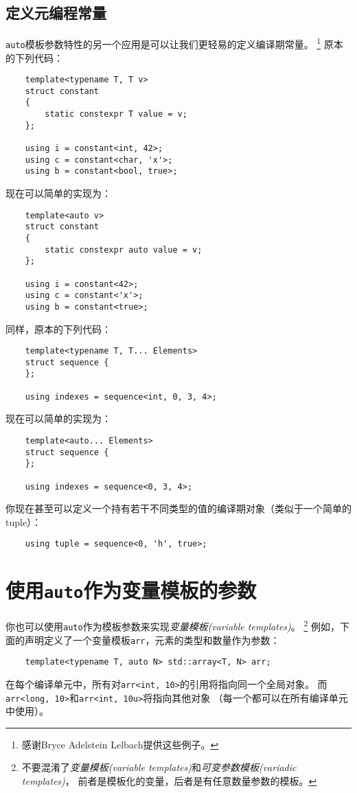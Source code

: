 \subsection{定义元编程常量}
\texttt{auto}模板参数特性的另一个应用是可以让我们更轻易的定义编译期常量。
\footnote{感谢Bryce Adelstein Lelbach提供这些例子。}
原本的下列代码：
\begin{lstlisting}
    template<typename T, T v>
    struct constant
    {
        static constexpr T value = v;
    };

    using i = constant<int, 42>;
    using c = constant<char, 'x'>;
    using b = constant<bool, true>;
\end{lstlisting}
现在可以简单的实现为：
\begin{lstlisting}
    template<auto v>
    struct constant
    {
        static constexpr auto value = v;
    };

    using i = constant<42>;
    using c = constant<'x'>;
    using b = constant<true>;
\end{lstlisting}
同样，原本的下列代码：
\begin{lstlisting}
    template<typename T, T... Elements>
    struct sequence {
    };

    using indexes = sequence<int, 0, 3, 4>;
\end{lstlisting}
现在可以简单的实现为：
\begin{lstlisting}
    template<auto... Elements>
    struct sequence {
    };

    using indexes = sequence<0, 3, 4>;
\end{lstlisting}
你现在甚至可以定义一个持有若干不同类型的值的编译期对象（类似于一个简单的tuple）：
\begin{lstlisting}
    using tuple = sequence<0, 'h', true>;
\end{lstlisting}

\section{使用\texttt{auto}作为变量模板的参数}
你也可以使用\texttt{auto}作为模板参数来实现\emph{变量模板(variable templates)}。
\footnote{不要混淆了\emph{变量模板(variable templates)}和\emph{可变参数模板(variadic templates)}，
前者是模板化的变量，后者是有任意数量参数的模板。}
例如，下面的声明定义了一个变量模板\texttt{arr}，元素的类型和数量作为参数：
\begin{lstlisting}
    template<typename T, auto N> std::array<T, N> arr;
\end{lstlisting}
在每个编译单元中，所有对\texttt{arr<int, 10>}的引用将指向同一个全局对象。
而\texttt{arr<long, 10>}和\texttt{arr<int, 10u>}将指向其他对象
（每一个都可以在所有编译单元中使用）。

